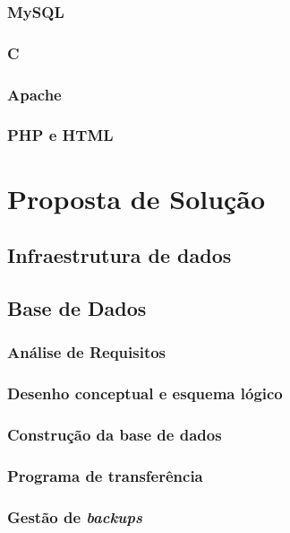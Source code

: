 \documentclass[11pt,twoside,a4paper]{report}
\begin{document}
\subsection{MySQL}

\subsection{C}

\subsection{Apache}

\subsection{PHP e HTML}

\cleardoublepage
\chapter{Proposta de Solução}
\section{Infraestrutura de dados}

\section{Base de Dados}
\subsection{Análise de Requisitos}

\subsection{Desenho conceptual e esquema lógico}

\subsection{Construção da base de dados}

\subsection{Programa de transferência}

\subsection{Gestão de \textit{backups}}
\label{subchap:backups}
\end{document}
